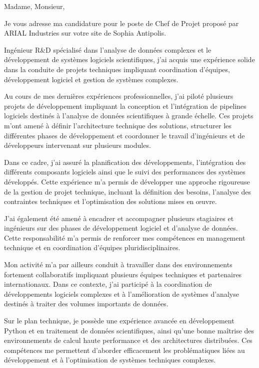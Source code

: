 \documentclass[11pt,a4paper]{altacv}
\begin{document}
{\color{body}

Madame, Monsieur,

Je vous adresse ma candidature pour le poste de Chef de Projet proposé par ARIAL Industries sur votre site de Sophia Antipolis.

Ingénieur R\&D spécialisé dans l’analyse de données complexes et le développement de systèmes logiciels scientifiques, j’ai acquis une expérience solide dans la conduite de projets techniques impliquant coordination d’équipes, développement logiciel et gestion de systèmes complexes.

Au cours de mes dernières expériences professionnelles, j’ai piloté plusieurs projets de développement impliquant la conception et l’intégration de pipelines logiciels destinés à l’analyse de données scientifiques à grande échelle. Ces projets m’ont amené à définir l’architecture technique des solutions, structurer les différentes phases de développement et coordonner le travail d’ingénieurs et de développeurs intervenant sur plusieurs modules.

Dans ce cadre, j’ai assuré la planification des développements, l’intégration des différents composants logiciels ainsi que le suivi des performances des systèmes développés. Cette expérience m’a permis de développer une approche rigoureuse de la gestion de projet technique, incluant la définition des besoins, l’analyse des contraintes techniques et l’optimisation des solutions mises en œuvre.

J’ai également été amené à encadrer et accompagner plusieurs stagiaires et ingénieurs sur des phases de développement logiciel et d’analyse de données. Cette responsabilité m’a permis de renforcer mes compétences en management technique et en coordination d’équipes pluridisciplinaires.

Mon activité m’a par ailleurs conduit à travailler dans des environnements fortement collaboratifs impliquant plusieurs équipes techniques et partenaires internationaux. Dans ce contexte, j’ai participé à la coordination de développements logiciels complexes et à l’amélioration de systèmes d’analyse destinés à traiter des volumes importants de données.

Sur le plan technique, je possède une expérience avancée en développement Python et en traitement de données scientifiques, ainsi qu’une bonne maîtrise des environnements de calcul haute performance et des architectures distribuées. Ces compétences me permettent d’aborder efficacement les problématiques liées au développement et à l’optimisation de systèmes techniques complexes.

}
\end{document}
